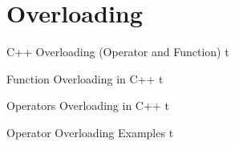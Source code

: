\documentclass[../lecture5-objectorientation.tex]{subfiles}
\begin{document}
\section{Overloading}


\begin{frame}[fragile]{C++ Overloading (Operator and Function)}
t
\end{frame}


\begin{frame}[fragile]{Function Overloading in C++}
t
\end{frame}


\begin{frame}[fragile]{Operators Overloading in C++}
t
\end{frame}


\begin{frame}[fragile]{Operator Overloading Examples}
t
\end{frame}

\end{document}
